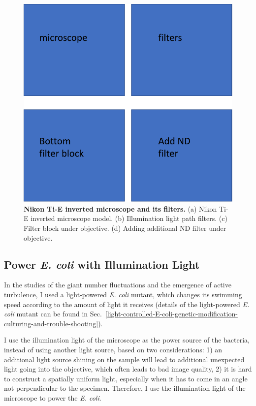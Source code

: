 \begin{figure}[!htbp]
	\begin{center}
	\includegraphics[width=5.5 in]{Figs/2-Exp/3.pdf}
	\end{center}
	\caption[Figure 2.3:]
	{
	\textbf{Nikon Ti-E inverted microscope and its filters.}
	(a) Nikon Ti-E inverted microscope model.
	(b) Illumination light path filters.
	(c) Filter block under objective.
	(d) Adding additional ND filter under objective.
	}
	\label{fig:2-3}
\end{figure}

\subsection{Power \textit{E. coli} with Illumination Light}
In the studies of the giant number fluctuations and the emergence of active turbulence, I used a light-powered \textit{E. coli} mutant, which changes its swimming speed according to the amount of light it receives (details of the light-powered \textit{E. coli} mutant can be found in Sec.~\ref{light-controlled-E-coli-genetic-modification-culturing-and-trouble-shooting}).

I use the illumination light of the microscope as the power source of the bacteria, instead of using another light source, based on two considerations: 1) an additional light source shining on the sample will lead to additional unexpected light going into the objective, which often leads to bad image quality, 2) it is hard to construct a spatially uniform light, especially when it has to come in an angle not perpendicular to the specimen. Therefore, I use the illumination light of the microscope to power the \textit{E. coli}.


